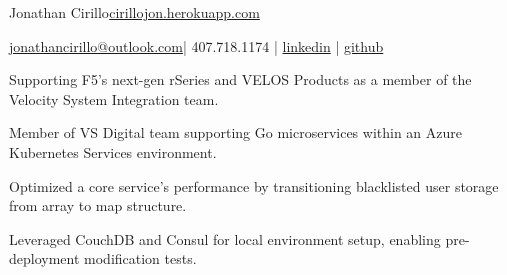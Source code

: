 \documentclass[]{deedy-resume-openfont}
\begin{document}
%
%


\namesection \LARGE {{Jonathan} {Cirillo}}{\href{https://cirillojon.herokuapp.com/}{cirillojon.herokuapp.com}}

\vspace{18pt}

\newcommand{\linkedin}[1]{\faLinkedin\hspace{0.5em}\href{https://linkedin.com/in/#1}{\texttt{#1}}}
\newcommand{\github}[1]{\faGithub\hspace{0.5em}\href{https://github.com/#1}{\texttt{#1}}}

{\FA \faEnvelope} {\href{mailto:jonathancirillo@outlook.com}{jonathancirillo@outlook.com}}\hspace{5pt}|\hspace{5pt}{\FA \faPhone} 407.718.1174 |\hspace{5pt} {\FA \faLinkedin} {\href{https://linkedin.com/in/jonathan-cirillo/}{linkedin}} \hspace{5pt}|\hspace{5pt} {\FA \faGithub} {\href{https://github.com/cirillojon}{github}}


\vspace{6pt}



\begin{tightemize}
\item Supporting F5's next-gen rSeries and VELOS Products as a member of the Velocity System Integration team.
\end{tightemize}
\sectionsep


\begin{tightemize}
\item Member of VS Digital team supporting Go microservices within an Azure Kubernetes Services environment.
\item Optimized a core service's performance by transitioning blacklisted user storage from array to map structure.
\item Leveraged CouchDB and Consul for local environment setup, enabling pre-deployment modification tests.
\end{tightemize}
\sectionsep
\end{document}
